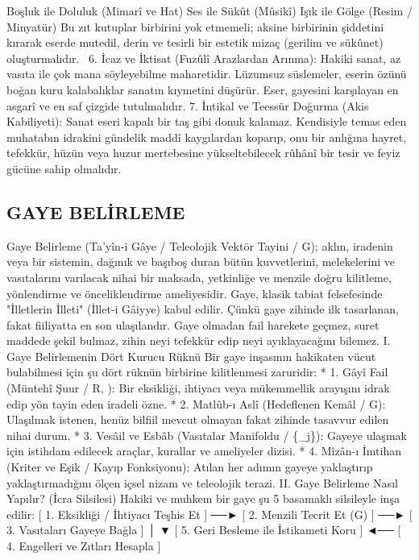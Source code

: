 \documentclass[11pt,a4paper]{article}
\begin{document}
 Boşluk ile Doluluk (Mimarî ve Hat)
 Ses ile Sükût (Mûsikî)
 Işık ile Gölge (Resim / Minyatür)
Bu zıt kutuplar birbirini yok etmemeli; aksine birbirinin şiddetini kırarak eserde mutedil, derin ve tesirli bir estetik mizaç (gerilim ve sükûnet) oluşturmalıdır.  
 6. İcaz ve İktisat (Fuzûlî Arazlardan Arınma):
Hakiki sanat, az vasıta ile çok mana söyleyebilme maharetidir. Lüzumsuz süslemeler, eserin özünü boğan kuru kalabalıklar sanatın kıymetini düşürür. Eser, gayesini karşılayan en asgarî ve en saf çizgide tutulmalıdır.
 7. İntikal ve Teessür Doğurma (Akis Kabiliyeti):
Sanat eseri kapalı bir taş gibi donuk kalamaz. Kendisiyle temas eden muhatabın idrakini gündelik maddî kaygılardan koparıp, onu bir anlığına hayret, tefekkür, hüzün veya huzur mertebesine yükseltebilecek rûhânî bir tesir ve feyiz gücüne sahip olmalıdır.







\subsection{GAYE BELİRLEME}




Gaye Belirleme (Ta'yîn-i Gâye / Teleolojik Vektör Tayini / G); aklın, iradenin veya bir sistemin, dağınık ve başıboş duran bütün kuvvetlerini, melekelerini ve vasıtalarını varılacak nihai bir maksada, yetkinliğe ve menzile doğru kilitleme, yönlendirme ve önceliklendirme ameliyesidir.
Gaye, klasik tabiat felsefesinde "İlletlerin İlleti" (İllet-i Gâiyye) kabul edilir. Çünkü gaye zihinde ilk tasarlanan, fakat fiiliyatta en son ulaşılandır. Gaye olmadan fail harekete geçmez, suret maddede şekil bulmaz, zihin neyi tefekkür edip neyi ayıklayacağını bilemez.
I. Gaye Belirlemenin Dört Kurucu Rüknü
Bir gaye inşasının hakikaten vücut bulabilmesi için şu dört rüknün birbirine kilitlenmesi zaruridir:
 * 1. Gâyî Fail (Müntehî Şuur / R, ): Bir eksikliği, ihtiyacı veya mükemmellik arayışını idrak edip yön tayin eden iradeli özne.
 * 2. Matlûb-ı Aslî (Hedeflenen Kemâl / G): Ulaşılmak istenen, henüz bilfiil mevcut olmayan fakat zihinde tasavvur edilen nihai durum.
 * 3. Vesâil ve Esbâb (Vasıtalar Manifoldu / \{_j\}): Gayeye ulaşmak için istihdam edilecek araçlar, kurallar ve ameliyeler dizisi.
 * 4. Mîzân-ı İmtihan (Kriter ve Eşik / Kayıp Fonksiyonu): Atılan her adımın gayeye yaklaştırıp yaklaştırmadığını ölçen içsel nizam ve teleolojik terazi.
II. Gaye Belirleme Nasıl Yapılır? (İcra Silsilesi)
Hakiki ve muhkem bir gaye şu 5 basamaklı silsileyle inşa edilir:
[ 1. Eksikliği / İhtiyacı Teşhis Et ] ──► [ 2. Menzili Tecrit Et (G) ] ──► [ 3. Vasıtaları Gayeye Bağla ]
                                                                                   │
                                                                                   ▼
[ 5. Geri Besleme ile İstikameti Koru ] ◄── [ 4. Engelleri ve Zıtları Hesapla ]
\end{document}
